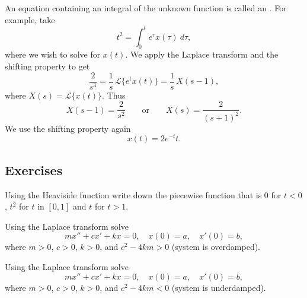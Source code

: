 \documentclass[12pt]{book}
\begin{document}
\begin{example}
An equation containing an integral of the unknown function is
called an \emph{}.  For example, take
\begin{equation*}
t^2 = \int_0^t e^{\tau} x(\tau) ~d\tau ,
\end{equation*}
where we wish to solve for $x(t)$.
We apply the Laplace transform and the shifting property to get
\begin{equation*}
\frac{2}{s^3} = \frac{1}{s} \, \mathcal{L} \{ e^{t} x(t) \}
=
\frac{1}{s} \, X(s-1) ,
\end{equation*}
where $X(s) = \mathcal{L} \{ x(t) \}$.  Thus
\begin{equation*}
X(s-1) =
\frac{2}{s^2} \qquad \text{or} \qquad
X(s) =
\frac{2}{{(s+1)}^2}.
\end{equation*}
We use the shifting property again
\begin{equation*}
x(t) = 2 e^{-t} t .
\end{equation*}
\end{example}

\subsection{Exercises}

\begin{exercise}
Using the Heaviside function write down the piecewise function
that is 0 for $t < 0$, $t^2$ for $t$ in $[0,1]$ and $t$ for $t > 1$.
\end{exercise}

\begin{exercise}
Using the Laplace transform solve
\begin{equation*}
m x'' + c x' + k x = 0 , \quad x(0) = a, \quad x'(0) = b ,
\end{equation*}
where $m > 0$, $c > 0$, $k > 0$, and
$c^2 - 4km > 0$ (system is overdamped).
\end{exercise}

\begin{exercise}
Using the Laplace transform solve
\begin{equation*}
m x'' + c x' + k x = 0 , \quad x(0) = a, \quad x'(0) = b ,
\end{equation*}
where $m > 0$, $c > 0$, $k > 0$, and
$c^2 - 4km < 0$ (system is underdamped).
\end{exercise}
\end{document}
